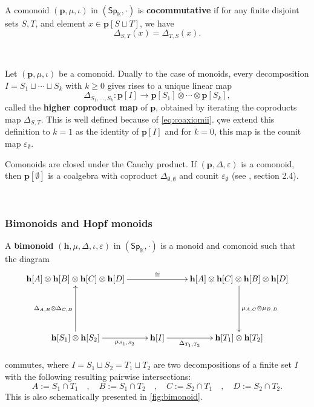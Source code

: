 \documentclass[12pt, reqno]{amsart}
\theoremstyle{definition}
\newcommand{\Ssk}{\mathsf{Sp}_\Kb} %
\newcommand{\Kb}{\mathbb{K}}
\newcommand{\thh}{\mathbf{h}}
\newcommand{\tp}{\mathbf{p}}
\begin{document}
\

A comonoid $(\tp, \mu, \iota)$ in $(\Ssk, \cdot)$ is {\bf cocommutative} if for any finite disjoint sets $S, T$, and element $x\in \tp[S\sqcup T]$, we have
\begin{equation*}
    \Delta_{S,T}(x)=\Delta_{T,S}(x).
\end{equation*}

\

Let $(\tp, \mu, \iota)$ be a comonoid. Dually to the case of monoids, every decomposition $I=S_1 \sqcup \cdots \sqcup S_k$ with $k \geq 0$ gives rises to a unique linear map
\begin{equation}
    \Delta_{S_1, \hdots, S_k}: \tp[I] \to \tp[S_1]\otimes \cdots \otimes \tp[S_k],
\end{equation}
called the {\bf higher coproduct map} of $\tp$, obtained by iterating the coproducts map $\Delta_{S,T}$. 
This is well defined because of \cref{eq:coaxiomii}.
çwe extend this definition to $k=1$ as the identity of $\tp[I]$ and for $k=0$, this map is the counit map $\varepsilon_\emptyset$.

Comonoids are closed under the Cauchy product. 
If $(\tp, \Delta, \varepsilon)$ is a comonoid, then $\tp[\emptyset]$ is a coalgebra with coproduct $\Delta_{\emptyset, \emptyset}$ and counit $\varepsilon_\emptyset$ (see \cite{AM2013}, section 2.4).

\

\subsubsection{Bimonoids  and Hopf monoids}
A {\bf bimonoid} $(\thh, \mu, \Delta, \iota, \varepsilon)$ in $(\Ssk, \cdot)$ is a monoid and comonoid such that the diagram
\[\xymatrix{
\thh[A] \otimes \thh[B] \otimes \thh[C] \otimes \thh[D] \ar[rr]^-{\cong} && \thh[A] \otimes \thh[C] \otimes \thh[B] \otimes \thh[D] \ar[dd]^-{\mu_{A,C}\otimes\mu_{B,D}}\\
&&\\
\thh[S_1]\otimes \thh[S_2]\ar[uu]^-{\Delta_{A,B}\otimes \Delta_{C,D}} \ar[r]_-{\mu_{S_1, S_2}} & \thh[I] \ar[r]_-{\Delta_{T_1, T_2}} & \thh[T_1]\otimes \thh[T_2]
}\]

commutes, where $I=S_1\sqcup S_2=T_1 \sqcup T_2$ are two decompositions of a finite set $I$ with the following resulting pairwise intersections:
\[A:=S_1\cap T_1 \quad , \quad B:=S_1 \cap T_2 \quad , \quad C:=S_2 \cap T_1 \quad , \quad D:=S_2 \cap T_2.\]
This is also schematically presented in \cref{fig:bimonoid}.
\end{document}
